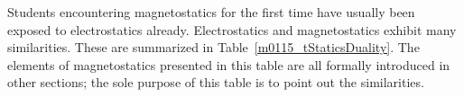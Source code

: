 

\label{m0115_Comparison_of_Electrostatics_and_Magnetostatics} %

Students encountering magnetostatics 
for the first time have usually been exposed to electrostatics 
already.
Electrostatics and magnetostatics exhibit many similarities.
These are summarized in Table~\ref{m0115_tStaticsDuality}.
The elements of magnetostatics presented in this table are all formally introduced in other sections; the sole purpose of this table is to point out the similarities.  
%
